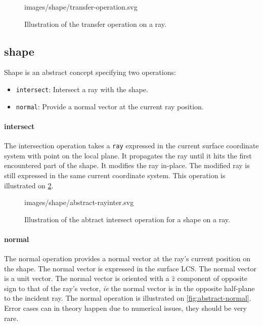 \begin{figure} \caption{\label{fig:transfer-operation}
Illustration of the transfer operation on a ray.}

           {images/shape/transfer-operation.svg}
\end{figure}

\subsection{shape}
Shape is an abstract concept specifying two operations:

\begin{itemize}
\item \lstinline{intersect}: Intersect a ray with the shape.
\item \lstinline{normal}: Provide a normal vector at the current ray
      position.
\end{itemize}

\paragraph{intersect}
The intersection operation takes a \lstinline{ray} expressed in the current
surface coordinate system with point on the local plane. It propagates
the ray until it hits the first encountered part of the shape. It modifies
the ray in-place. The modified ray is still expressed in the same current
coordinate system. This operation is illustrated on
\cref{fig:abstract-rayinter}.

\begin{figure} \caption{\label{fig:abstract-rayinter} Illustration of the
abtract intersect operation for a shape on a ray.}

           {images/shape/abstract-rayinter.svg}
\end{figure}

\paragraph{normal}
The normal operation provides a normal vector at the ray's current
position on the shape. The normal vector is expressed in the surface
LCS. The normal vector is a unit vector. The normal vector is oriented
with a $\hat{z}$ component of opposite sign to that of the ray's vector,
\textit{ie} the normal vector is in the opposite half-plane to the incident
ray. The normal operation is illustrated on \cref{fig:abstract-normal}. Error
cases can in theory happen due to numerical issues, they should be very rare.

